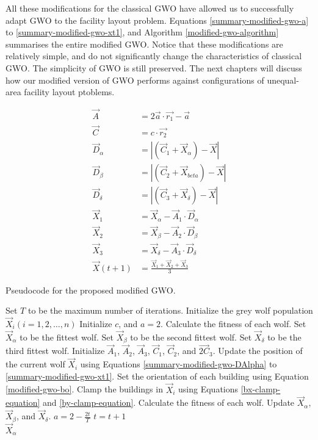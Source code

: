 All these modifications for the classical GWO have allowed us to successfully adapt GWO to the facility layout problem. Equations \ref{summary-modified-gwo-a} to \ref{summary-modified-gwo-xt1}, and Algorithm \ref{modified-gwo-algorithm} summarises the entire modified GWO. Notice that these modifications are relatively simple, and do not significantly change the characteristics of classical GWO. The simplicity of GWO is still preserved. The next chapters will discuss how our modified version of GWO performs against configurations of unequal-area facility layout ptoblems.

\begin{align}
	\vec{A} &= 2\vec{a} \cdot \vec{r_{1}} - \vec{a} \label{summary-modified-gwo-a} \\
	\vec{C} &= c \cdot \vec{r_{2}} \\
	\vec{D}_{\alpha} &= \left | \left ( \vec{C}_{1} + \vec{X}_{\alpha} \right ) - \vec{X} \right | \label{summary-modified-gwo-DAlpha} \\
	\vec{D}_{\beta} &= \left | \left ( \vec{C}_{2} + \vec{X}_{beta} \right ) - \vec{X} \right | \\
	\vec{D}_{\delta} &= \left | \left ( \vec{C}_{3} + \vec{X}_{\delta} \right ) - \vec{X} \right | \\
	\vec{X}_{1} &= \vec{X}_{\alpha} - \vec{A}_{1} \cdot \vec{D}_{\alpha} \\
	\vec{X}_{2} &= \vec{X}_{\beta} - \vec{A}_{2} \cdot \vec{D}_{\beta} \\
	\vec{X}_{3} &= \vec{X}_{\delta} - \vec{A}_{3} \cdot \vec{D}_{\delta} \\
	\vec{X}(t + 1) &= \frac{\vec{X}_{1} + \vec{X}_{2} + \vec{X}_{3}}{3} \label{summary-modified-gwo-xt1}
\end{align}

\begin{algorithm}[h!]
\caption{Pseudocode for the proposed modified GWO.}
\label{modified-gwo-algorithm}
\begin{algorithmic}[1]
\State Set $T$ to be the maximum number of iterations.
\State Initialize the grey wolf population $\vec{X}_{i} (i = 1, 2, \ldots, n)$
\State Initialize $c$, and $a = 2$.
\State Calculate the fitness of each wolf.
\State Set $\vec{X}_{\alpha}$ to be the fittest wolf.
\State Set $\vec{X}_{\beta}$ to be the second fittest wolf.
\State Set $\vec{X}_{\delta}$ to be the third fittest wolf.
		\State Initialize $\vec{A}_{1}$, $\vec{A}_{2}$, $\vec{A}_{3}$, $\vec{C}_{1}$, $\vec{C}_{2}$, and $\vec{2C}_{3}$.
		\State Update the position of the current wolf $\vec{X}_{i}$ using Equations \ref{summary-modified-gwo-DAlpha} to \ref{summary-modified-gwo-xt1}.
		\State Set the orientation of each building using Equation \ref{modified-gwo-bo}.
		\State Clamp the buildings in $\vec{X}_{i}$ using Equations \ref{bx-clamp-equation} and \ref{by-clamp-equation}.
	\EndFor
	\State Calculate the fitness of each wolf.
	\State Update $\vec{X}_{\alpha}$, $\vec{X}_{\beta}$, and $\vec{X}_{\delta}$.
	\State $a = 2 - \frac{2t}{T}$
	\State $t = t + 1$
\EndWhile \\
\Return $\vec{X}_{\alpha}$
\end{algorithmic}
\end{algorithm}


